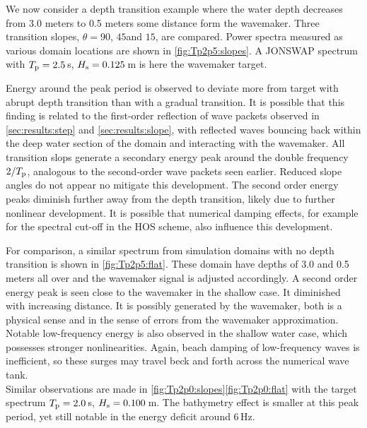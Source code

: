 \documentclass[internal]{sintefmemo}
\renewcommand{\_}[1]{_\mr{#1}}
\begin{document}
We now consider a depth transition example where the water depth decreases from 3.0 meters to 0.5 meters some distance form the wavemaker. 
Three transition slopes, $\theta = 90$\textdegree, $45$\textdegree and $15$\textdegree, are compared.
Power spectra measured as various domain locations are shown in \autoref{fig:Tp2p5:slopes}.
A JONSWAP spectrum with $T\_p=2.5$\,s, $H\_s=0.125$\,m is here the wavemaker target.

Energy around the peak period is observed to deviate more from target with abrupt depth transition than with a gradual transition. 
It is possible that this finding is related to the first-order reflection of wave packets observed in \autoref{sec:results:step}  and  \ref{sec:results:slope}, with reflected waves bouncing back within the deep water section of the domain and interacting with the wavemaker. 
All transition slops generate a secondary energy peak around the double frequency $2/T\_p$, analogous to the second-order wave packets seen earlier. 
Reduced slope angles do not appear no mitigate this development.
The second order energy peaks diminish further away from the depth transition, likely due to further nonlinear development. 
It is possible that numerical damping effects, for example for the spectral cut-off in the HOS scheme, also influence this development. 
 
For comparison, a similar spectrum from simulation domains with no depth transition is shown in \autoref{fig:Tp2p5:flat}.
These domain have depths of 3.0 and 0.5 meters all over and the wavemaker signal is adjusted accordingly. 
A second order energy peak is seen close to the wavemaker in the shallow case. It diminished with increasing distance. 
It is possibly generated by the wavemaker, both is a physical sense and in the sense of errors from the wavemaker approximation.
Notable low-frequency energy is also observed in the shallow water case, which possesses stronger nonlinearities. 
Again, beach damping of low-frequency waves is inefficient, so these surges may travel beck and forth across the numerical wave tank. 
\\

Similar observations are made in  \autoref{fig:Tp2p0:slopes}\ref{fig:Tp2p0:flat} with the target spectrum $T\_p=2.0$\,s, $H\_s=0.100$\,m.
The bathymetry effect is smaller at this peak period, yet still notable in the energy deficit around 6\,Hz.
\end{document}
